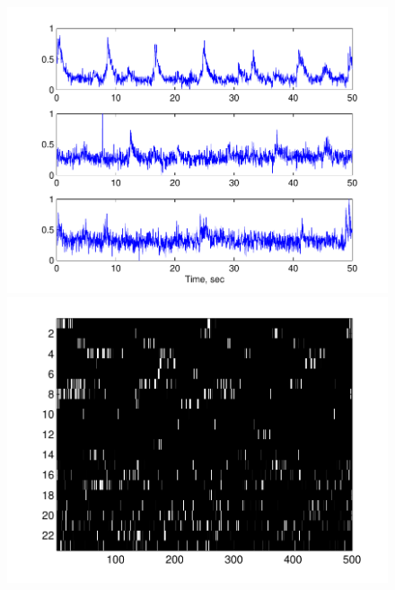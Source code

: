 \begin{figure}[h]
\centering
\begin{minipage}[c]{0.45\hsize}
\includegraphics[width=\hsize]{../figs/FigureA11_real_traces}
\end{minipage}
\begin{minipage}[c]{0.45\hsize}
\includegraphics[width=\hsize]{../figs/FigureA11_real_raster}
\end{minipage}
\begin{minipage}[c]{0.3\hsize}

\end{minipage}
\end{figure}
